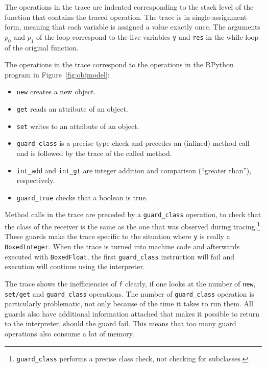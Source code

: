 \documentclass{sigplanconf}
\begin{document}
The operations in the trace are indented
corresponding to the stack level of the function that contains the traced
operation. The trace is in single-assignment form, meaning that each variable is
assigned a value exactly once. The arguments $p_0$ and $p_1$ of the loop correspond
to the live variables \lstinline{y} and \lstinline{res} in the while-loop of
the original function.

The operations in the trace correspond to the operations in the RPython program
in Figure~\ref{fig:objmodel}:

\begin{itemize}
    \item \lstinline{new} creates a new object.
    \item \lstinline{get} reads an attribute of an object.
    \item \lstinline{set} writes to an attribute of an object.
    \item \lstinline{guard_class} is a precise type check and precedes an
    (inlined) method call and is followed by the trace of the called method.
    \item \lstinline{int_add} and \lstinline{int_gt} are integer addition and
    comparison (``greater than''), respectively.
    \item \lstinline{guard_true} checks that a boolean is true.
\end{itemize}

Method calls in the trace are preceded by a \lstinline{guard_class}
operation, to check that the class of the receiver is the same as the one that
was observed during tracing.\footnote{\lstinline{guard_class}
performs a precise
class check, not checking for subclasses.} These guards make the trace specific
to the situation where \lstinline{y} is really a \lstinline{BoxedInteger}. When
the trace is turned into machine code and afterwards executed with
\lstinline{BoxedFloat}, the
first \lstinline{guard_class} instruction will fail and execution will continue
using the interpreter.

The trace shows the inefficiencies of \lstinline{f} clearly, if one looks at
the number of \lstinline{new}, \lstinline{set/get} and \lstinline{guard_class}
operations. The number of \lstinline{guard_class} operation is particularly
problematic, not only because of the time it takes to run them. All guards also
have additional information attached that makes it possible to return to the
interpreter, should the guard fail. This means that too many guard operations also
consume a lot of memory.
\end{document}
